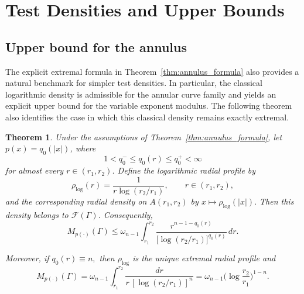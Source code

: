 \documentclass[12pt]{amsart}
\numberwithin{equation}{section}
\theoremstyle{plain}
\newtheorem{theorem}[equation]{Theorem}
\theoremstyle{definition}
\begin{document}
\section{Test Densities and Upper Bounds}
\label{sec:bounds}

\subsection{Upper bound for the annulus}

The explicit extremal formula in Theorem~\ref{thm:annulus_formula}
also provides a natural benchmark for simpler test densities. In
particular, the classical logarithmic density is admissible for the
annular curve family and yields an explicit upper bound for the
variable exponent modulus. The following theorem also identifies the
case in which this classical density remains exactly extremal.

\begin{theorem}
\label{thm:annulus_bounds}
Under the assumptions of Theorem~\ref{thm:annulus_formula}, let $p(x)=q_0(|x|)$,
where
\begin{equation*}
1<q_0^-\le q_0(r)\le q_0^+<\infty
\end{equation*}
for almost every $r\in(r_1,r_2)$.
Define the logarithmic radial profile by
\begin{equation}
\label{eq:log_test_profile}
\rho_{\log}(r)
=
\frac{1}{r\log(r_2/r_1)},
\qquad r\in(r_1,r_2),
\end{equation}
and the corresponding radial density on $A(r_1,r_2)$ by
$x\longmapsto \rho_{\log}(|x|).$
Then this density belongs to $\mathcal F(\Gamma)$. Consequently,
\begin{equation}
\label{eq:annulus_log_upper_bound}
M_{p(\cdot)}(\Gamma)
\le
\omega_{n-1}
\int_{r_1}^{r_2}
\frac{r^{n-1-q_0(r)}}
{\bigl[\log(r_2/r_1)\bigr]^{q_0(r)}}
\,dr.
\end{equation}

Moreover, if $q_0(r)\equiv n,$
then $\rho_{\log}$ is the unique extremal radial profile and
\begin{equation}
\label{eq:annulus_log_equality}
M_{p(\cdot)}(\Gamma)
=
\omega_{n-1}
\int_{r_1}^{r_2}
\frac{dr}
{r\,[\log(r_2/r_1)]^n}
=
\omega_{n-1}
\biggl(\log\frac{r_2}{r_1}\biggr)^{1-n}.
\end{equation}
\end{theorem}
\end{document}
